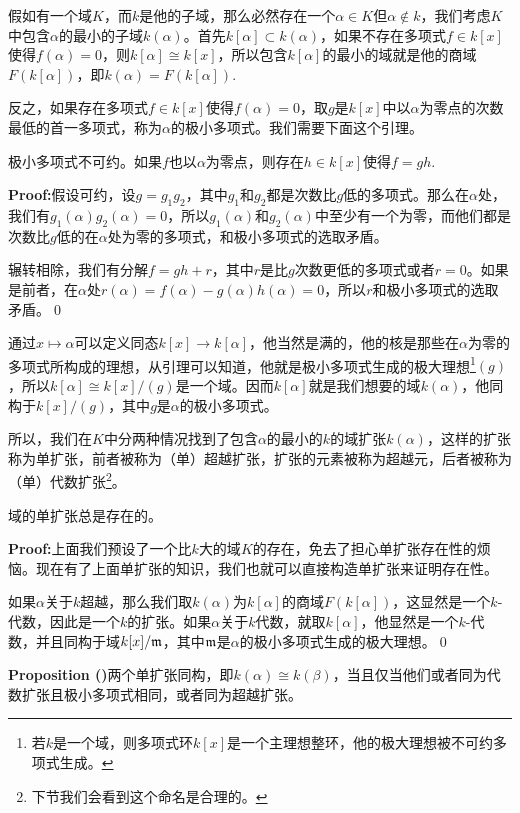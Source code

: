 \documentclass[9pt]{extarticle}
\newcommand{\paracount}[1]{\refstepcounter{para}\textbf{#1 (\thepara)}}
\newcommand{\pro}{\paracount{Proposition}}
\renewcommand{\proof}{\textbf{Proof:}\hspace{0.5em}}
\begin{document}
假如有一个域$K$，而$k$是他的子域，那么必然存在一个$\alpha\in K$但$\alpha\notin k$，我们考虑$K$中包含$\alpha$的最小的子域$k(\alpha)$。首先$k[\alpha]\subset k(\alpha)$，如果不存在多项式$f\in k[x]$使得$f(\alpha)=0$，则$k[\alpha]\cong k[x]$，所以包含$k[\alpha]$的最小的域就是他的商域$F(k[\alpha])$，即$k(\alpha)=F(k[\alpha])$.

反之，如果存在多项式$f\in k[x]$使得$f(\alpha)=0$，取$g$是$k[x]$中以$\alpha$为零点的次数最低的首一多项式，称为$\alpha$的极小多项式。我们需要下面这个引理。
\begin{lem}
	极小多项式不可约。如果$f$也以$\alpha$为零点，则存在$h\in k[x]$使得$f=gh$.
\end{lem}

\proof 假设可约，设$g=g_1g_2$，其中$g_1$和$g_2$都是次数比$g$低的多项式。那么在$\alpha$处，我们有$g_1(\alpha)g_2(\alpha)=0$，所以$g_1(\alpha)$和$g_2(\alpha)$中至少有一个为零，而他们都是次数比$g$低的在$\alpha$处为零的多项式，和极小多项式的选取矛盾。

	辗转相除，我们有分解$f=gh+r$，其中$r$是比$g$次数更低的多项式或者$r=0$。如果是前者，在$\alpha$处$r(\alpha)=f(\alpha)-g(\alpha)h(\alpha)=0$，所以$r$和极小多项式的选取矛盾。\qed

通过$x\mapsto \alpha$可以定义同态$k[x]\to k[\alpha]$，他当然是满的，他的核是那些在$\alpha$为零的多项式所构成的理想，从引理可以知道，他就是极小多项式生成的极大理想\footnote{若$k$是一个域，则多项式环$k[x]$是一个主理想整环，他的极大理想被不可约多项式生成。}$(g)$，所以$k[\alpha]\cong k[x]/(g)$是一个域。因而$k[\alpha]$就是我们想要的域$k(\alpha)$，他同构于$k[x]/(g)$，其中$g$是$\alpha$的极小多项式。

所以，我们在$K$中分两种情况找到了包含$\alpha$的最小的$k$的域扩张$k(\alpha)$，这样的扩张称为单扩张，前者被称为（单）超越扩张，扩张的元素被称为超越元，后者被称为（单）代数扩张\footnote{下节我们会看到这个命名是合理的。}。

\begin{theo}
	域的单扩张总是存在的。
\end{theo}

\proof 上面我们预设了一个比$k$大的域$K$的存在，免去了担心单扩张存在性的烦恼。现在有了上面单扩张的知识，我们也就可以直接构造单扩张来证明存在性。

	如果$\alpha$关于$k$超越，那么我们取$k(\alpha)$为$k[\alpha]$的商域$F(k[\alpha])$，这显然是一个$k$-代数，因此是一个$k$的扩张。如果$\alpha$关于$k$代数，就取$k[\alpha]$，他显然是一个$k$-代数，并且同构于域$k[x]/\mathfrak{m}$，其中$\mathfrak{m}$是$\alpha$的极小多项式生成的极大理想。\qed

\pro 	两个单扩张同构，即$k(\alpha)\cong k(\beta)$，当且仅当他们或者同为代数扩张且极小多项式相同，或者同为超越扩张。
\end{document}
